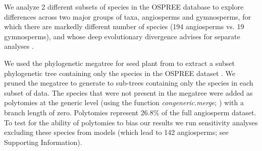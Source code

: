 \documentclass{article}\usepackage[]{graphicx}\usepackage[]{color}
\begin{document}
We analyze 2 different subsets of species in the OSPREE database to explore differences across two major groups of taxa, angiosperms and gymnosperms, for which there are markedly different number of species (194 angiosperms vs. 19 gymnosperms), and whose deep evolutionary divergence advises for separate analyses \citep{}.\\


\begin{comment}
\begin{enumerate}
\item Description of the OSPREE database (where it comes from, number of species, studies, etc.). %

\item We analyze 5 different subsets of species in the OSPREE database to explore differences across taxa (effect of gymnosperms?) and to test to what extent data resolution affects the results:

\begin{enumerate}
\item Species grouped in generic complexes, to ensure enough cross-treatment data, as in Ettinger et al. (under review) (including 52 complexes)[flags.for.mainmodel=T]
\item All species in the main model (including 117 species resulting from )[flags.for.mainmodel=T]
\item All angiosperm species in the main model (including 110 species)[flags.for.mainmodel=T]
\item All species in the latest version of OSPREE (including 231 species resulting from )[flags.for.allsppmodel=T]
\item All angiosperm species in the latest version of OSPREE (including 215 species)[flags.for.allsppmodel=T]
\end{enumerate}
\end{comment}

We used the phylogenetic megatree for seed plant from \citet{smith2018constructing} to extract a subset phylogenetic tree containing only the species in the OSPREE dataset \citep{wolkovich2019}. We pruned the megatree to generate to sub-trees containing only the species in each subset of data. The species that were not present in the megatree were added as polytomies at the generic level (using the function \emph{congeneric.merge}; \citep{pearse2015pez}) with a branch length of zero. Polytomies represent 26.8\% of the full angiosperm dataset. To test for the ability of polytomies to bias our results we run sensitivity analyses excluding these species from models (which lead to 142 angiosperms; see Supporting Information). \\ 
\end{document}
